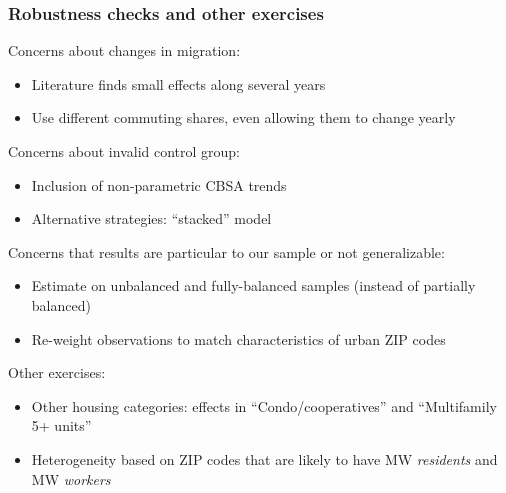 \documentclass[aspectratio=169, t]{beamer}
\begin{document}
\begin{frame}[label = robustness]
    \frametitle{Robustness checks and other exercises}

    Concerns about changes in migration:
    \begin{itemize} \small
        \item Literature finds small effects along several years {\small\color{gray}\parencite[e.g.,][]{PerezPerez2021}}
        \item Use different commuting shares, even allowing them to change yearly
        
    \end{itemize}

    \pause
    \vspace{1.5mm}
    Concerns about invalid control group:
    \begin{itemize} \small
        \item Inclusion of non-parametric CBSA trends
        \item Alternative strategies: ``stacked'' model 
        {\small \color{gray} \parencite{CegnizEtAl2019}}
    \end{itemize}

    \pause
    \vspace{1.5mm}
    Concerns that results are particular to our sample or not generalizable:
    \begin{itemize} \small
        \item Estimate on unbalanced and fully-balanced samples (instead of partially balanced)
        \item Re-weight observations to match characteristics of urban ZIP codes
    \end{itemize}
    
    \pause
    \vspace{1.5mm}
    Other exercises:
    \begin{itemize} \small
        \item Other housing categories: effects in ``Condo/cooperatives'' and ``Multifamily 5+ units''
        \item Heterogeneity based on ZIP codes that are likely to have MW \textit{residents} 
        and MW \textit{workers}
    \end{itemize}
\end{frame}

\end{document}
